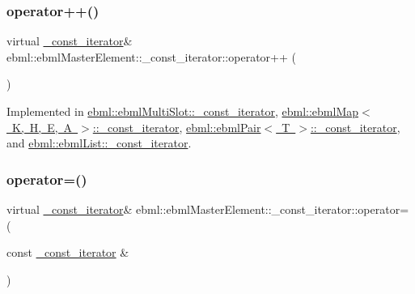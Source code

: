 \mbox{\label{classebml_1_1ebmlMasterElement_1_1__const__iterator_a439f540325443a3c3a3acdcd8df81553}} 
\subsubsection{\texorpdfstring{operator++()}{operator++()}}
{\footnotesize\ttfamily virtual \mbox{\hyperlink{classebml_1_1ebmlMasterElement_1_1__const__iterator}{\+\_\+const\+\_\+iterator}}\& ebml\+::ebml\+Master\+Element\+::\+\_\+const\+\_\+iterator\+::operator++ (\begin{DoxyParamCaption}{ }\end{DoxyParamCaption})\hspace{0.3cm}{\ttfamily [pure virtual]}}



Implemented in \mbox{\hyperlink{classebml_1_1ebmlMultiSlot_1_1__const__iterator_a4d9425007a96cb4803ef3cff5bf88e00}{ebml\+::ebml\+Multi\+Slot\+::\+\_\+const\+\_\+iterator}}, \mbox{\hyperlink{classebml_1_1ebmlMap_1_1__const__iterator_a7a58190879091815afc606e295afd1cf}{ebml\+::ebml\+Map$<$ K, H, E, A $>$\+::\+\_\+const\+\_\+iterator}}, \mbox{\hyperlink{classebml_1_1ebmlPair_1_1__const__iterator_a504a93a5fa6b77f8604016c50957ef0c}{ebml\+::ebml\+Pair$<$ T $>$\+::\+\_\+const\+\_\+iterator}}, and \mbox{\hyperlink{classebml_1_1ebmlList_1_1__const__iterator_a20f27b727326834e8b2a1c1dd66ffbce}{ebml\+::ebml\+List\+::\+\_\+const\+\_\+iterator}}.

\mbox{\label{classebml_1_1ebmlMasterElement_1_1__const__iterator_a102cf8b36c0d8184680ef15594bb59fb}} 
\subsubsection{\texorpdfstring{operator=()}{operator=()}}
{\footnotesize\ttfamily virtual \mbox{\hyperlink{classebml_1_1ebmlMasterElement_1_1__const__iterator}{\+\_\+const\+\_\+iterator}}\& ebml\+::ebml\+Master\+Element\+::\+\_\+const\+\_\+iterator\+::operator= (\begin{DoxyParamCaption}\item[{const \mbox{\hyperlink{classebml_1_1ebmlMasterElement_1_1__const__iterator}{\+\_\+const\+\_\+iterator}} \&}]{ }\end{DoxyParamCaption})\hspace{0.3cm}{\ttfamily [pure virtual]}}



